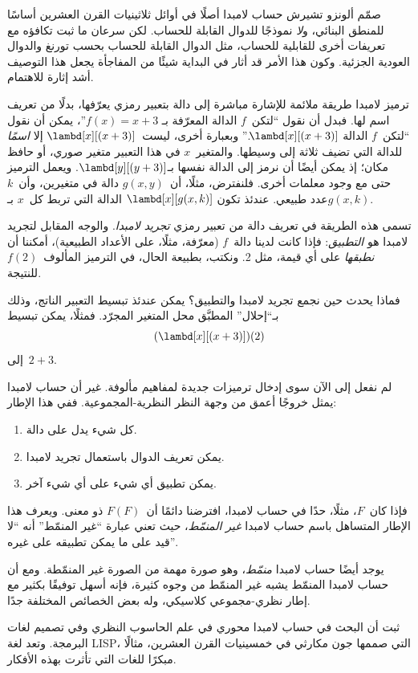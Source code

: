 \documentclass[../../../include/open-logic-section]{subfiles}
\begin{document}

صمّم ألونزو تشيرش حساب لامبدا أصلًا في أوائل ثلاثينيات القرن العشرين
أساسًا للمنطق البنائي، و\emph{لا} نموذجًا للدوال القابلة للحساب. لكن سرعان
ما ثبت تكافؤه مع تعريفات أخرى للقابلية للحساب، مثل الدوال القابلة للحساب
بحسب تورنغ والدوال العودية الجزئية. وكون هذا الأمر قد أثار في البداية
شيئًا من المفاجأة يجعل هذا التوصيف أشد إثارة للاهتمام.

ترميز لامبدا طريقة ملائمة للإشارة مباشرة إلى دالة بتعبير رمزي يعرّفها،
بدلًا من تعريف اسم لها. فبدل أن نقول ``لتكن~$f$ الدالة المعرّفة بـ
$f(x) = x + 3$''، يمكن أن نقول ``لتكن~$f$ الدالة
$\lambd[x][(x + 3)]$.'' وبعبارة أخرى، ليست~$\lambd[x][(x+3)]$ إلا
\emph{اسمًا} للدالة التي تضيف ثلاثة إلى وسيطها. والمتغير~$x$ في هذا
التعبير متغير صوري، أو حافظ مكان؛ إذ يمكن أيضًا أن نرمز إلى الدالة نفسها
بـ$\lambd[y][(y + 3)]$. ويعمل الترميز حتى مع وجود معلمات أخرى. فلنفترض،
مثلًا، أن~$g(x, y)$ دالة في متغيرين، وأن~$k$ عدد طبيعي. عندئذ تكون
$\lambd[x][g(x,k)]$ الدالة التي تربط كل~$x$ بـ$g(x, k)$.

تسمى هذه الطريقة في تعريف دالة من تعبير رمزي \emph{تجريد لامبدا}. والوجه
المقابل لتجريد لامبدا هو \emph{التطبيق}: فإذا كانت لدينا دالة~$f$ (معرّفة،
مثلًا، على الأعداد الطبيعية)، أمكننا أن \emph{نطبقها} على أي قيمة، مثل
2. ونكتب، بطبيعة الحال، في الترميز المألوف~$f(2)$ للنتيجة.

فماذا يحدث حين نجمع تجريد لامبدا والتطبيق؟ يمكن عندئذ تبسيط التعبير
الناتج، وذلك بـ``إحلال'' المطبَّق محل المتغير المجرّد. فمثلًا، يمكن تبسيط
\[
(\lambd[x][(x + 3)])(2)
\]
إلى~$2 + 3$.

لم نفعل إلى الآن سوى إدخال ترميزات جديدة لمفاهيم مألوفة. غير أن حساب
لامبدا يمثل خروجًا أعمق من وجهة النظر النظرية-المجموعية. ففي هذا الإطار:
\begin{enumerate}
\item كل شيء يدل على دالة.
\item يمكن تعريف الدوال باستعمال تجريد لامبدا.
\item يمكن تطبيق أي شيء على أي شيء آخر.
\end{enumerate}
فإذا كان~$F$، مثلًا، حدًا في حساب لامبدا، افترضنا دائمًا أن~$F(F)$ ذو
معنى. ويعرف هذا الإطار المتساهل باسم حساب لامبدا \emph{غير المنمّط}، حيث
تعني عبارة ``غير المنمّط'' أنه ``لا قيد على ما يمكن تطبيقه على غيره''.

\begin{digress}
يوجد أيضًا حساب لامبدا \emph{منمّط}، وهو صورة مهمة من الصورة غير
المنمّطة. ومع أن حساب لامبدا المنمّط يشبه غير المنمّط من وجوه كثيرة، فإنه
أسهل توفيقًا بكثير مع إطار نظري-مجموعي كلاسيكي، وله بعض الخصائص المختلفة
جدًا.

ثبت أن البحث في حساب لامبدا محوري في علم الحاسوب النظري وفي تصميم لغات
البرمجة. وتعد لغة LISP، التي صممها جون مكارثي في خمسينيات القرن العشرين،
مثالًا مبكرًا للغات التي تأثرت بهذه الأفكار.
\end{digress}
\end{document}
